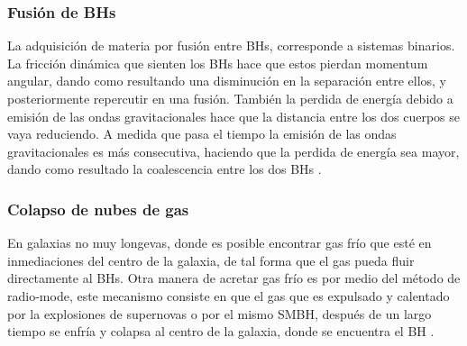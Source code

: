     \subsubsection{Fusión de BHs}
    \label{subsubsec: mergers_BHs}
La adquisición de materia por fusión entre BHs, corresponde a sistemas  binarios. La fricción dinámica que sienten los BHs  hace que estos pierdan momentum angular, dando como resultando una disminución en la separación entre ellos, y posteriormente repercutir en una fusión. También la perdida de energía debido a emisión de las ondas gravitacionales hace que la distancia entre los dos cuerpos se vaya reduciendo. A medida que pasa el tiempo la emisión de las ondas gravitacionales es más consecutiva, haciendo que la perdida de energía sea mayor, dando como resultado la coalescencia entre los dos BHs \cite{fanidakis2011}. 

    \subsubsection{Colapso de nubes de gas}
    \label{subsubsec: colapso_nubes_gas}
En galaxias no muy longevas, donde es posible encontrar gas frío que esté en inmediaciones del centro de la galaxia, de tal forma que el gas pueda fluir directamente al BHs. Otra manera de acretar gas frío es por medio del método de radio-mode, este mecanismo consiste en que el gas que es expulsado y calentado por la explosiones de supernovas o por el mismo SMBH, después de un largo tiempo se enfría y colapsa al centro de la galaxia, donde se encuentra el BH \cite{fanidakis2011}.

